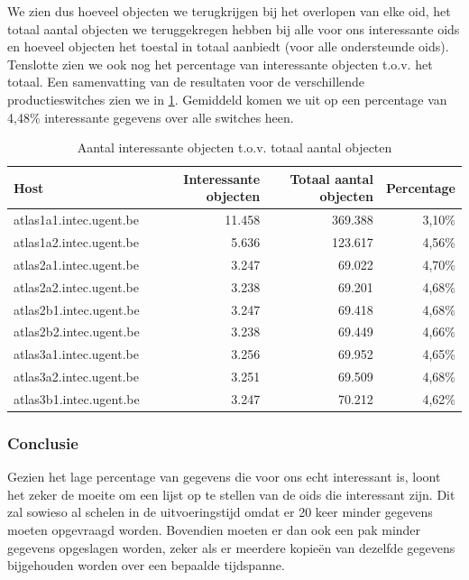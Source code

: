 We zien dus hoeveel objecten we terugkrijgen bij het overlopen van elke \gls{oid},
het totaal aantal objecten we teruggekregen hebben bij alle voor ons interessante \glspl{oid} en
hoeveel objecten het toestal in totaal aanbiedt (voor alle ondersteunde \glspl{oid}).
Tenslotte zien we ook nog het percentage van interessante objecten t.o.v. het totaal.
Een samenvatting van de resultaten voor de verschillende productieswitches zien we in \cref{tabel-fracties}.
Gemiddeld komen we uit op een percentage van 4,48\% interessante gegevens over alle switches heen.

\begin{table}[h]
\centering
\begin{tabular}{@{}lrrr@{}}
\toprule
Host                    & Interessante objecten & Totaal aantal objecten & Percentage \\ \midrule
atlas1a1.intec.ugent.be & 11.458                & 369.388                & 3,10\%     \\
atlas1a2.intec.ugent.be & 5.636                 & 123.617                & 4,56\%     \\
atlas2a1.intec.ugent.be & 3.247                 & 69.022                 & 4,70\%     \\
atlas2a2.intec.ugent.be & 3.238                 & 69.201                 & 4,68\%     \\
atlas2b1.intec.ugent.be & 3.247                 & 69.418                 & 4,68\%     \\
atlas2b2.intec.ugent.be & 3.238                 & 69.449                 & 4,66\%     \\
atlas3a1.intec.ugent.be & 3.256                 & 69.952                 & 4,65\%     \\
atlas3a2.intec.ugent.be & 3.251                 & 69.509                 & 4,68\%     \\
atlas3b1.intec.ugent.be & 3.247                 & 70.212                 & 4,62\%     \\ \bottomrule
\end{tabular}
\caption{Aantal interessante objecten t.o.v. totaal aantal objecten}
\label{tabel-fracties}
\end{table}

\subsubsection{Conclusie}

Gezien het lage percentage van gegevens die voor ons echt interessant is,
loont het zeker de moeite om een lijst op te stellen van de \glspl{oid} die interessant zijn.
Dit zal sowieso al schelen in de uitvoeringstijd omdat er 20 keer minder gegevens moeten opgevraagd worden.
Bovendien moeten er dan ook een pak minder gegevens opgeslagen worden,
zeker als er meerdere kopieën van dezelfde gegevens bijgehouden worden over een bepaalde tijdspanne.


